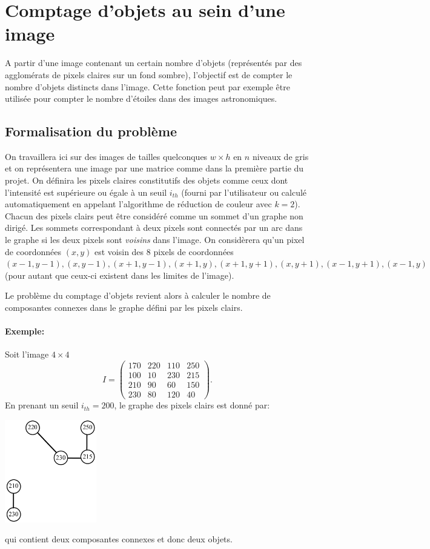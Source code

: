\documentclass[a4paper,10pt]{article}
\begin{document}
\section{Comptage d'objets au sein d'une image}

A partir d'une image contenant un certain nombre d'objets (représentés par des agglomérats de pixels claires sur un fond sombre), l'objectif est de compter le nombre d'objets
distincts dans l'image. Cette fonction peut par exemple être utilisée
pour compter le nombre d'étoiles dans des images astronomiques.

\subsection*{Formalisation du problème}

On travaillera ici sur des images de tailles quelconques $w\times h$
en $n$ niveaux de gris et on représentera une image par une matrice
comme dans la première partie du projet. On définira les pixels
claires constitutifs des objets comme ceux dont l'intensité est
supérieure {\color{red} ou égale} à un seuil $i_{th}$ (fourni par
l'utilisateur ou calculé automatiquement en appelant l'algorithme de
réduction de couleur avec $k=2$). Chacun des pixels clairs peut être
considéré comme un sommet d'un graphe non dirigé. Les sommets
correspondant à deux pixels sont connectés par un arc dans le graphe
si les deux pixels sont {\it voisins} dans l'image. On considèrera
qu'un pixel de coordonnées $(x,y)$ est voisin des 8 pixels de
coordonnées $(x-1,y-1), (x,y-1), (x+1,y-1), (x+1,y), (x+1, y+1),
(x,y+1), (x-1,y+1), (x-1,y)$ (pour autant que ceux-ci existent dans
les limites de l'image).

Le problème du comptage d'objets revient alors à calculer le nombre de
composantes connexes dans le graphe défini par les pixels clairs.

\paragraph{Exemple:} Soit l'image $4\times 4$
$$I=\left(\begin{matrix}
170&220&110&250\\
100&10&230&215\\
210&90&60&150\\
230&80&120&40
\end{matrix}\right).
$$
En prenant un seuil $i_{th}=200$, le graphe des pixels clairs est donné par:
\begin{center}
\includegraphics[width=4cm]{pict3.pdf}
\end{center}
qui contient deux composantes connexes et donc deux objets.
\end{document}
